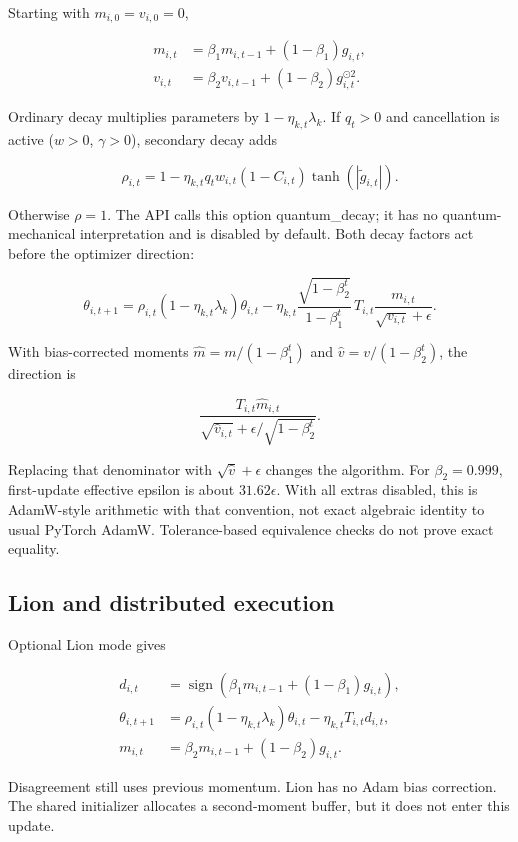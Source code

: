 \documentclass[11pt,a4paper]{article}
\theoremstyle{definition}
\theoremstyle{remark}
\begin{document}
Starting with $m_{i,0}=v_{i,0}=0$,

\[
\begin{aligned}
m_{i,t}&=\beta_1m_{i,t-1}+(1-\beta_1)g_{i,t},\\
v_{i,t}&=\beta_2v_{i,t-1}+(1-\beta_2)g_{i,t}^{\odot2}.
\end{aligned}
\]

Ordinary decay multiplies parameters by $1-\eta_{k,t}\lambda_k$. If $q_t>0$ and cancellation is active ($w>0$, $\gamma>0$), secondary decay adds

\[
\rho_{i,t}=1-\eta_{k,t}q_tw_{i,t}(1-C_{i,t})\tanh(|\widetilde g_{i,t}|).
\]

Otherwise $\rho=1$. The API calls this option quantum\_decay; it has no quantum-mechanical interpretation and is disabled by default. Both decay factors act before the optimizer direction:

\[
\boxed{\theta_{i,t+1}=\rho_{i,t}(1-\eta_{k,t}\lambda_k)\theta_{i,t}
-\eta_{k,t}\frac{\sqrt{1-\beta_2^t}}{1-\beta_1^t}\,T_{i,t}\frac{m_{i,t}}{\sqrt{v_{i,t}}+\epsilon}.}
\]

With bias-corrected moments $\widehat m=m/(1-\beta_1^t)$ and $\widehat v=v/(1-\beta_2^t)$, the direction is

\[
\frac{T_{i,t}\widehat m_{i,t}}{\sqrt{\widehat v_{i,t}}+\epsilon/\sqrt{1-\beta_2^t}}.
\]

Replacing that denominator with $\sqrt{\widehat v}+\epsilon$ changes the algorithm. For $\beta_2=0.999$, first-update effective epsilon is about $31.62\epsilon$. With all extras disabled, this is AdamW-style arithmetic with that convention, not exact algebraic identity to usual PyTorch AdamW. Tolerance-based equivalence checks do not prove exact equality.

\subsection{Lion and distributed execution}

Optional Lion mode gives

\[
\begin{aligned}
d_{i,t}&=\operatorname{sign}(\beta_1m_{i,t-1}+(1-\beta_1)g_{i,t}),\\
\theta_{i,t+1}&=\rho_{i,t}(1-\eta_{k,t}\lambda_k)\theta_{i,t}-\eta_{k,t}T_{i,t}d_{i,t},\\
m_{i,t}&=\beta_2m_{i,t-1}+(1-\beta_2)g_{i,t}.
\end{aligned}
\]

Disagreement still uses previous momentum. Lion has no Adam bias correction. The shared initializer allocates a second-moment buffer, but it does not enter this update.
\end{document}
